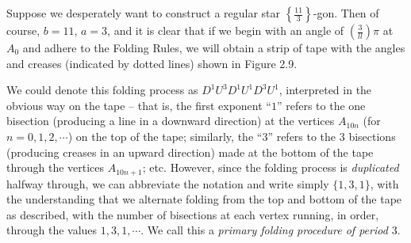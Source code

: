 Suppose we desperately want to construct a regular star $\left\{ \frac{11}{3} \right\}$-gon. Then of course, $b = 11$, $a = 3$, and it is clear that if we begin with an angle of $\left( \frac{3}{ll} \right) \pi$ at $A_{0}$ and adhere to the Folding Rules, we will obtain a strip of tape with the angles and creases (indicated by dotted lines) shown in Figure 2.9. 

We could denote this folding process as $D^{1} U^{3} D^{1} U^{1} D^{3} U^{1}$, interpreted in the obvious way on the tape -- that is, the first exponent ``$1$'' refers to the one bisection (producing a line in a downward direction) at the vertices $A_{10n}$ (for $n = 0,1,2,\cdots$) on the top of the tape; similarly, the ``$3$'' refers to the $3$ bisections (producing creases in an upward direction) made at the bottom of the tape through the vertices $A_{10n+1}$; etc. However, since the folding process is \emph{duplicated} halfway through, we can abbreviate the notation and write simply $\{ 1,3,1 \}$, with the understanding that we alternate folding from the top and bottom of the tape as described, with the number of bisections at each vertex running, in order, through the values $1,3,1,\cdots$. We call this a \emph{primary folding procedure of period $3$}.

